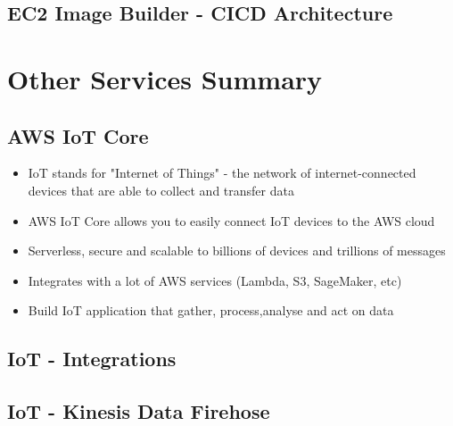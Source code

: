 \subsection{EC2 Image Builder - CICD Architecture}


\section{Other Services Summary}

\subsection{AWS IoT Core}
\begin{itemize}
    \item IoT stands for "Internet of Things" - the network of internet-connected devices that are able to collect and transfer data
    \item AWS IoT Core allows you to easily connect IoT devices to the AWS cloud
    \item Serverless, secure and scalable to billions of devices and trillions of messages
    \item Integrates with a lot of AWS services (Lambda, S3, SageMaker, etc)
    \item Build IoT application that gather, process,analyse and act on data
\end{itemize}

\subsection{IoT - Integrations}

\subsection{IoT - Kinesis Data Firehose}
